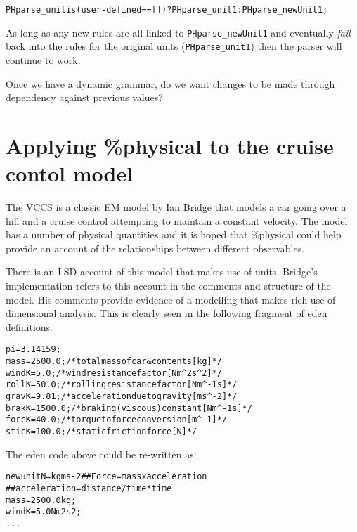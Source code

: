 \documentclass[a4paper]{article}
\begin{document}
\begin{alltt}
PHparse_unit is (user-defined == []) ? PHparse_unit1 : PHparse_newUnit1;
\end{alltt}

As long as any new rules are all linked to \texttt{PHparse\_newUnit1} and 
eventually \emph{fail} back into
the rules for the original units (\texttt{PHparse\_unit1}) then the parser will 
continue to work.





Once we have a dynamic grammar, do we want changes to be made through 
dependency against previous values?



\section{Applying \%physical to the cruise contol model \label{vccs}}

The VCCS is a classic EM model by Ian Bridge \cite{EM_vccs} that models a car 
going over a hill and a cruise control attempting to maintain a constant 
velocity. The model has a number of physical quantities and it is hoped that 
\%physical could help provide an account of the relationships between different 
observables.

There is an LSD account of this model that makes use of units. Bridge's 
implementation refers to this account in the comments and structure of the 
model. His comments provide evidence of
a modelling that makes rich use of dimensional analysis. This is clearly seen in 
the following fragment
of eden definitions.

\begin{alltt}
  pi     = 3.14159;   
  mass   = 2500.0;  /* total mass of car & contents [kg]     */
  windK  = 5.0;     /* wind resistance factor [N m^2 s^2]    */
  rollK  = 50.0;    /* rolling resistance factor [N m^-1 s]  */
  gravK  = 9.81;    /* acceleration due to gravity [m s^-2]  */
  brakK  = 1500.0;  /* braking (viscous) constant [N m^-1 s] */
  forcK  = 40.0;    /* torque to force conversion [m^-1]     */
  sticK  = 100.0;   /* static friction force [N]             */
     \hfill\cite[\texttt{vehicle_dynamics.e}]{EM_vccs}
\end{alltt}

The eden code above could be re-written as:

\begin{alltt}
	%physical
	new unit N = kgms{-2} ## Force = mass x acceleration
                           ## acceleration = distance / time*time
	mass  = 2500.0 kg;
	windK = 5.0 Nm{2}s{2};
	...
\end{alltt}
\end{document}
